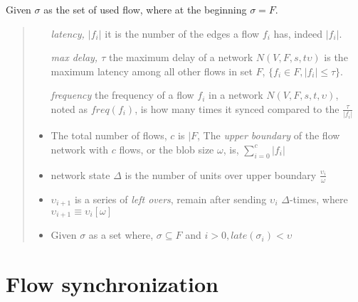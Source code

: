 \documentclass{article}
\begin{document}
Given $\sigma$ as the set of used flow, where at the beginning $\sigma = F$.

\begin{quote}

  \begin{itemize}
  \item [\textit{latency, $|f_i|$ }] it is the number of the edges a flow $f_i$ has, indeed $|f_i|$.

  \item [\textit{max delay, $\tau$}] the maximum delay of a network $N(V,F,s,t\upsilon)$ is the maximum latency among all other flows in set $F$, $\{f_i \in F, |f_i| \leq \tau\}$.

  \item [\textit{frequency}] the frequency of a flow $f_i$ in a network $N(V,F,s,t,\upsilon)$, noted as $freq(f_i)$, is how many times it synced compared to the  $\frac{\tau}{|f_i|}$

  \item The total number of flows, $c$ is $|F$, The \textit{upper boundary} of the flow network with $c$ flows, or the blob size $\omega$, is, $\sum\limits^{c}_{i=0}{|f_i|} $

  \item network state $\Delta$ is the number of units over upper boundary $\frac{\upsilon_{i}}{\omega}$

  \item $\upsilon_{i+1}$ is a series of \textit{left overs}, remain after sending $\upsilon_{i}$ $\Delta$-times, where $\upsilon_{i+1}  \equiv \upsilon_{i}[\omega]$

  \item Given $\sigma$ as a set where, $\sigma \subseteq F$ and $i > 0, late(\sigma_i) < \upsilon$
  \end{itemize}

\end{quote}

\section{Flow synchronization}
\end{document}
